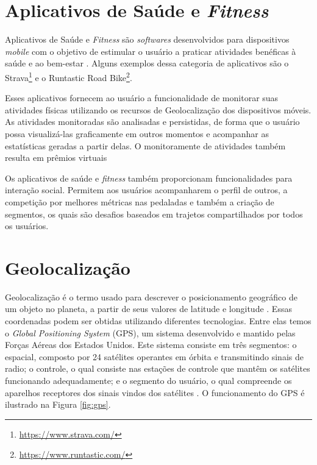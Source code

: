 \section{Aplicativos de Saúde e \textit{Fitness}}
Aplicativos de Saúde e \textit{Fitness} são \textit{softwares} desenvolvidos para dispositivos \textit{mobile} com o objetivo de estimular o usuário a praticar atividades benéficas à saúde e ao bem-estar \cite{bonome2012}. Alguns exemplos dessa categoria de aplicativos são o Strava\footnote{\url{https://www.strava.com/}} e o Runtastic Road Bike\footnote{\url{https://www.runtastic.com/}}.

\par Esses aplicativos fornecem ao usuário a funcionalidade de monitorar suas atividades físicas utilizando os recursos de Geolocalização dos dispositivos móveis. As atividades monitoradas são analisadas e persistidas, de forma que o usuário possa visualizá-las graficamente em outros momentos e acompanhar as estatísticas geradas a partir delas. O monitoramente de atividades também resulta em prêmios virtuais

\par Os aplicativos de saúde e \textit{fitness} também proporcionam funcionalidades para interação social. Permitem aos usuários acompanharem o perfil de outros, a competição por melhores métricas nas pedaladas e também a criação de segmentos, os quais são desafios baseados em trajetos compartilhados por todos os usuários.

\section{Geolocalização}
Geolocalização é o termo usado para descrever o posicionamento geográfico de um objeto no planeta, a partir de seus valores de latitude e longitude \cite{aires2014}. Essas coordenadas podem ser obtidas utilizando diferentes tecnologias. Entre elas temos o \textit{Global Positioning System} (GPS), um sistema desenvolvido e mantido pelas Forças Aéreas dos Estados Unidos. Este sistema consiste em três segmentos: o espacial, composto por 24 satélites operantes em órbita e transmitindo sinais de radio; o controle, o qual consiste nas estações de controle que mantêm os satélites funcionando adequadamente; e o segmento do usuário, o qual compreende os aparelhos receptores dos sinais vindos dos satélites \cite{gpsgov}. O funcionamento do GPS é ilustrado na Figura \ref{fig:gps}. \par

